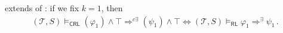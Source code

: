 \documentclass{article}
\newcommand{\traian}[1]{\todo[author=Traian]{#1}}
\newcommand{\RL}{\mathsf{RL}}
\newcommand{\CRL}{\mathsf{CRL}}
\newcommand{\Tcfg}{\mathcal{T}_{\mathit{Cfg}}}
\begin{document}
\begin{remark}
 extends  of :
if we fix $k=1$, then
\begin{align*}
    (\mathcal{T}, S) \vDash_\CRL
    (\varphi_1) \land \top  \Rightarrow^{c\exists}
    (\psi_1) \land \top
    \iff
    (\mathcal{T}, S) \vDash_\RL \varphi_1 \Rightarrow^{\exists} \psi_1 \, .
\end{align*}
\end{remark}

\end{document}
